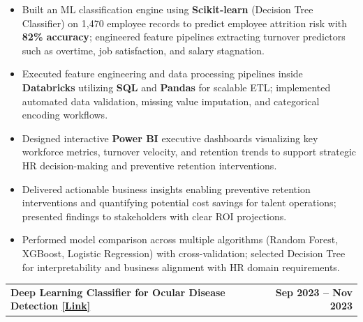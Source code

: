 \documentclass[10pt,a4paper]{article}
\makeatletter
\newcommand{\entry}[2]{%
    \noindent
    \begin{tabularx}{\linewidth}{@{}X r@{}}
        \textbf{#1} & \textbf{#2}
    \end{tabularx}
    \vspace{-2pt}
}
\makeatother
\begin{document}
\begin{itemize}

\item Built an ML classification engine using \textbf{Scikit-learn} (Decision Tree Classifier) on 1,470 employee records to predict employee attrition risk with \textbf{82\% accuracy}; engineered feature pipelines extracting turnover predictors such as overtime, job satisfaction, and salary stagnation.

\item Executed feature engineering and data processing pipelines inside \textbf{Databricks} utilizing \textbf{SQL} and \textbf{Pandas} for scalable ETL; implemented automated data validation, missing value imputation, and categorical encoding workflows.

\item Designed interactive \textbf{Power BI} executive dashboards visualizing key workforce metrics, turnover velocity, and retention trends to support strategic HR decision-making and preventive retention interventions.

\item Delivered actionable business insights enabling preventive retention interventions and quantifying potential cost savings for talent operations; presented findings to stakeholders with clear ROI projections.

\item Performed model comparison across multiple algorithms (Random Forest, XGBoost, Logistic Regression) with cross-validation; selected Decision Tree for interpretability and business alignment with HR domain requirements.

\end{itemize}

\vspace{1pt}

\entry
{Deep Learning Classifier for Ocular Disease Detection
\hspace{2pt}
\href{https://github.com/marideharshith21}
{\textcolor{linkblue}{[Link]}}}
{Sep 2023 -- Nov 2023}
\end{document}
